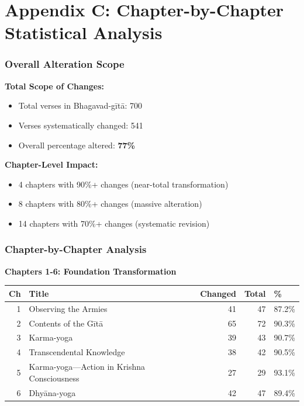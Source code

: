 \documentclass[11pt,twoside]{book}
\begin{document}
\part*{Appendix C: Chapter-by-Chapter Statistical Analysis}
\label{sec:org6091f01}
\section*{Overall Alteration Scope}
\label{sec:org9cbe7c1}

\textbf{\textbf{Total Scope of Changes:}}
\begin{itemize}
\item Total verses in Bhagavad-gītā: 700
\item Verses systematically changed: 541
\item Overall percentage altered: \textbf{\textbf{77\%}}
\end{itemize}

\textbf{\textbf{Chapter-Level Impact:}}
\begin{itemize}
\item 4 chapters with 90\%+ changes (near-total transformation)
\item 8 chapters with 80\%+ changes (massive alteration)
\item 14 chapters with 70\%+ changes (systematic revision)
\end{itemize}
\section*{Chapter-by-Chapter Analysis}
\label{sec:org3253096}

\textbf{\textbf{Chapters 1-6: Foundation Transformation}}

\small
\begin{center}
\begin{tabular}{rlrrl}
Ch & Title & Changed & Total & \%\\
\hline
1 & Observing the Armies & 41 & 47 & 87.2\%\\
2 & Contents of the Gītā & 65 & 72 & 90.3\%\\
3 & Karma-yoga & 39 & 43 & 90.7\%\\
4 & Transcendental Knowledge & 38 & 42 & 90.5\%\\
5 & Karma-yoga—Action in Krishna Consciousness & 27 & 29 & 93.1\%\\
6 & Dhyāna-yoga & 42 & 47 & 89.4\%\\
\end{tabular}
\end{center}
\end{document}
